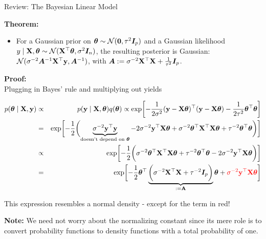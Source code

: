\begin{frame}[c, allowframebreaks]{Review: The Bayesian Linear Model}
\framebreak


\begin{footnotesize}
\textbf{Theorem:}\\
\begin{itemize}
  \item For a Gaussian prior on $\bm{\theta} \sim \mathcal{N}(\mathbf{0}, \tau^2 \boldsymbol{I}_p)$ and a Gaussian likelihood $y \mid \mathbf{X}, \bm{\theta} \sim \mathcal{N}(\mathbf{X}^\top \bm{\theta}, \sigma^2 \boldsymbol{I}_n)$, the resulting posterior is Gaussian: $\mathcal{N}(\sigma^{-2}\bm{A}^{-1}\mathbf{X}^\top\mathbf{y}, \bm{A}^{-1})$, with $\bm{A}:= \sigma^{-2}\mathbf{X}^\top\mathbf{X} + \frac{1}{\tau^2} \boldsymbol{I}_p$.
  \end{itemize}

\vspace{+.2cm}
\textbf{Proof:}\\
Plugging in Bayes' rule and multiplying out yields

\vspace{-.5cm}

\begin{eqnarray*}
p(\bm{\theta} \mid \mathbf{X}, \mathbf{y}) &\propto& p(\mathbf{y} \mid \mathbf{X}, \bm{\theta}) q(\bm{\theta}) \propto \exp\biggl[-\frac{1}{2\sigma^2}(\mathbf{y} - \mathbf{X}\bm{\theta})^\top(\mathbf{y} - \mathbf{X}\bm{\theta})-\frac{1}{2\tau^2}\bm{\theta}^\top\bm{\theta}\biggr] \\
&=& \exp\biggl[-\frac{1}{2}\biggl(\underbrace{\sigma^{-2}\mathbf{y}^\top\mathbf{y}}_{\text{doesn't depend on } \bm{\theta}} - 2 \sigma^{-2} \mathbf{y}^\top \mathbf{X} \bm{\theta} + \sigma^{-2}\bm{\theta}^\top \mathbf{X}^\top \mathbf{X} \bm{\theta}  + \tau^{-2} \bm{\theta}^\top\bm{\theta} \biggr)\biggr] \\
&\propto& \exp\biggl[-\frac{1}{2}\biggl(\sigma^{-2}\bm{\theta}^\top \mathbf{X}^\top \mathbf{X} \bm{\theta}  + \tau^{-2} \bm{\theta}^\top\bm{\theta}  - 2 \sigma^{-2} \mathbf{y}^\top \mathbf{X} \bm{\theta} \biggr)\biggr] \\
&=& \exp\biggl[-\frac{1}{2}\bm{\theta}^\top\underbrace{\biggl(\sigma^{-2} \mathbf{X}^\top \mathbf{X} + \tau^{-2} \boldsymbol{I}_p \biggr)}_{:= \mathbf{A}} \bm{\theta} + \textcolor{red}{\sigma^{-2} \mathbf{y}^\top \mathbf{X} \bm{\theta}}\biggr]
\end{eqnarray*}

This expression resembles a normal density - except for the term in red!




\framebreak

\textbf{Note:} We need not worry about the normalizing constant since its mere role is to convert probability functions to density functions with a total probability of one.


\end{footnotesize}
\end{frame}
